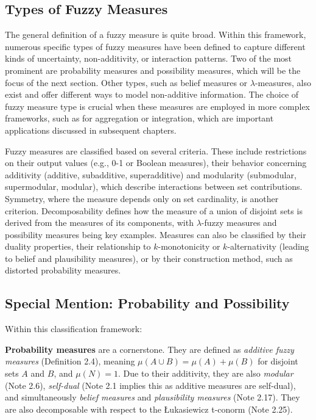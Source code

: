 \subsection{Types of Fuzzy Measures}
The general definition of a fuzzy measure is quite broad. Within this framework, numerous specific types of fuzzy measures have been defined to capture different kinds of uncertainty, non-additivity, or interaction patterns. Two of the most prominent are probability measures and possibility measures, which will be the focus of the next section. Other types, such as belief measures or $\lambda$-measures, also exist and offer different ways to model non-additive information. The choice of fuzzy measure type is crucial when these measures are employed in more complex frameworks, such as for aggregation or integration, which are important applications discussed in subsequent chapters.

Fuzzy measures are classified based on several criteria. These include restrictions on their output values (e.g., 0-1 or Boolean measures), their behavior concerning additivity  (additive, subadditive, superadditive) and modularity (submodular, supermodular, modular), which describe interactions between set contributions. Symmetry, where the measure depends only on set cardinality, is another criterion. Decomposability defines how the measure of a union of disjoint sets is derived from the measures of its components, with $\lambda$-fuzzy measures and possibility measures being key examples. Measures can also be classified by their duality properties, their relationship to $k$-monotonicity or $k$-alternativity (leading to belief and plausibility measures), or by their construction method, such as distorted probability measures.

\subsection*{Special Mention: Probability and Possibility}

Within this classification framework:

\textbf{Probability measures} are a cornerstone. They are defined as \textit{additive fuzzy measures} (Definition 2.4), meaning $\mu(A \cup B) = \mu(A) + \mu(B)$ for disjoint sets $A$ and $B$, and $\mu(N)=1$. Due to their additivity, they are also \textit{modular} (Note 2.6), \textit{self-dual} (Note 2.1 implies this as additive measures are self-dual), and simultaneously \textit{belief measures} and \textit{plausibility measures} (Note 2.17). They are also decomposable with respect to the Łukasiewicz t-conorm (Note 2.25).

